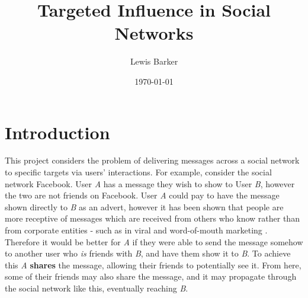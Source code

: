 \documentclass[bsc,frontabs,twoside,singlespacing,parskip,deptreport]{infthesis}     %
\begin{document}
\title{Targeted Influence in Social Networks}

\author{Lewis Barker}



\date{\today}

\abstract{

}

\maketitle

\tableofcontents



\chapter{Introduction}

This project considers the problem of delivering messages across a social network to specific targets via users' interactions. For example, consider the social network Facebook. User \textit{A} has a message they wish to show to User \textit{B}, however the two are not friends on Facebook. User \textit{A} could pay to have the message shown directly to \textit{B} as an advert, however it has been shown that people are more receptive of messages which are received from others who know rather than from corporate entities - such as in viral and word-of-mouth marketing \cite{viralmarketing, wordofmouth}. Therefore it would be better for \textit{A} if they were able to send the message somehow to another user who \textit{is} friends with \textit{B}, and have them show it to \textit{B}. To achieve this \textit{A} \textbf{shares} the message, allowing their friends to potentially see it. From here, some of their friends may also share the message, and it may propagate through the social network like this, eventually reaching \textit{B}.
\end{document}
